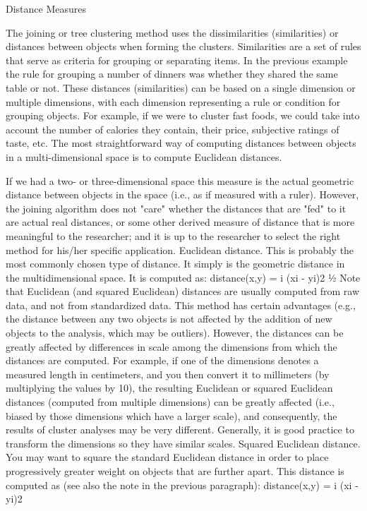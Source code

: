 
Distance Measures

The joining or tree clustering method uses the dissimilarities (similarities) or distances between objects when forming the clusters. Similarities are a set of rules that serve as criteria for grouping or separating items. In the previous example the rule for grouping a number of dinners was whether they shared the same table or not. These distances (similarities) can be based on a single dimension or multiple dimensions, with each dimension representing a rule or condition for grouping objects. For example, if we were to cluster fast foods, we could take into account the number of calories they contain, their price, subjective ratings of taste, etc. The most straightforward way of computing distances between objects in a multi-dimensional space is to compute Euclidean distances. 

If we had a two- or three-dimensional space this measure is the actual geometric distance between objects in the space (i.e., as if measured with a ruler). However, the joining algorithm does not "care" whether the distances that are "fed" to it are actual real distances, or some other derived measure of distance that is more meaningful to the researcher; and it is up to the researcher to select the right method for his/her specific application.
Euclidean distance. This is probably the most commonly chosen type of distance. It simply is the geometric distance in the multidimensional space. It is computed as:
distance(x,y) = {i (xi - yi)2 }½
Note that Euclidean (and squared Euclidean) distances are usually computed from raw data, and not from standardized data. This method has certain advantages (e.g., the distance between any two objects is not affected by the addition of new objects to the analysis, which may be outliers). However, the distances can be greatly affected by differences in scale among the dimensions from which the distances are computed. For example, if one of the dimensions denotes a measured length in centimeters, and you then convert it to millimeters (by multiplying the values by 10), the resulting Euclidean or squared Euclidean distances (computed from multiple dimensions) can be greatly affected (i.e., biased by those dimensions which have a larger scale), and consequently, the results of cluster analyses may be very different. Generally, it is good practice to transform the dimensions so they have similar scales.
Squared Euclidean distance. You may want to square the standard Euclidean distance in order to place progressively greater weight on objects that are further apart. This distance is computed as (see also the note in the previous paragraph):
distance(x,y) = i (xi - yi)2

